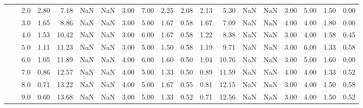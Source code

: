 \begin{tabular}{lllrrrrrrrrrrrrrrrr}
      &     & 2.0  &      2.80 &       7.18 &               NaN &                NaN & 3.00 &   7.00 &             2.25 &                         2.08 &      2.13 &       5.30 &               NaN &                NaN & 3.00 &   5.00 &             1.50 &                         0.00 \\
      &     & 3.0  &      1.65 &       8.86 &               NaN &                NaN & 3.00 &   5.00 &             1.67 &                         0.58 &      1.67 &       7.09 &               NaN &                NaN & 4.00 &   4.00 &             1.80 &                         0.00 \\
      &     & 4.0  &      1.53 &      10.42 &               NaN &                NaN & 3.00 &   6.00 &             1.67 &                         0.58 &      1.22 &       8.38 &               NaN &                NaN & 3.00 &   4.00 &             1.58 &                         0.45 \\
      &     & 5.0  &      1.11 &      11.23 &               NaN &                NaN & 3.00 &   5.00 &             1.50 &                         0.58 &      1.19 &       9.71 &               NaN &                NaN & 3.00 &   6.00 &             1.33 &                         0.58 \\
      &     & 6.0  &      1.05 &      11.89 &               NaN &                NaN & 4.00 &   6.00 &             1.60 &                         0.50 &      1.04 &      10.76 &               NaN &                NaN & 3.00 &   5.00 &             1.60 &                         0.00 \\
      &     & 7.0  &      0.86 &      12.57 &               NaN &                NaN & 4.00 &   5.00 &             1.33 &                         0.50 &      0.89 &      11.59 &               NaN &                NaN & 4.00 &   4.00 &             1.33 &                         0.52 \\
      &     & 8.0  &      0.71 &      13.22 &               NaN &                NaN & 4.00 &   5.00 &             1.67 &                         0.55 &      0.81 &      12.15 &               NaN &                NaN & 3.00 &   4.00 &             1.50 &                         0.58 \\
      &     & 9.0  &      0.60 &      13.68 &               NaN &                NaN & 3.00 &   5.00 &             1.33 &                         0.52 &      0.71 &      12.56 &               NaN &                NaN & 3.00 &   4.00 &             1.50 &                         0.52 \\

\end{tabular}
